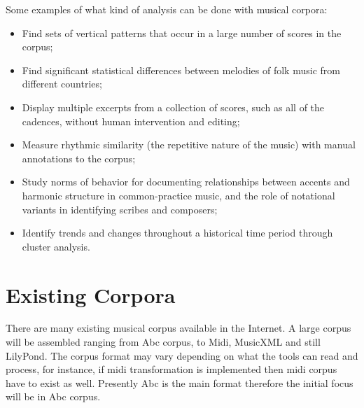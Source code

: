 \documentclass[main.tex]{files}
\begin{document}
Some examples of what kind of analysis can be done with musical corpora:
\begin{itemize}
  \item Find sets of vertical patterns that occur in a large number of scores in the
    corpus\cite{Conklin2002};
  \item Find significant statistical differences between melodies of folk music from different
    countries\cite{chai2001folk};
  \item Display multiple excerpts from a collection of scores, such as all of the cadences, without
    human intervention and editing\cite{Knopke};
  \item Measure rhythmic similarity (the repetitive nature of the music) with manual annotations to
    the corpus\cite{antonopoulos2007music};
  \item Study norms of behavior for documenting relationships between accents and harmonic structure
    in common-practice music, and the role of notational variants in identifying scribes and
    composers\cite{Ariza};
  \item Identify trends and changes throughout a historical time period through cluster
    analysis\cite{albrechtemergence}.
\end{itemize}

\section{Existing Corpora} 

There are many existing musical corpus available in the Internet. A large corpus will be assembled
ranging from Abc corpus, to Midi, MusicXML and still LilyPond.
The corpus format may vary depending on what the tools can read and process, for instance, if midi
transformation is implemented then midi corpus have to exist as well. Presently Abc is the main
format therefore the initial focus will be in Abc corpus.
\end{document}
